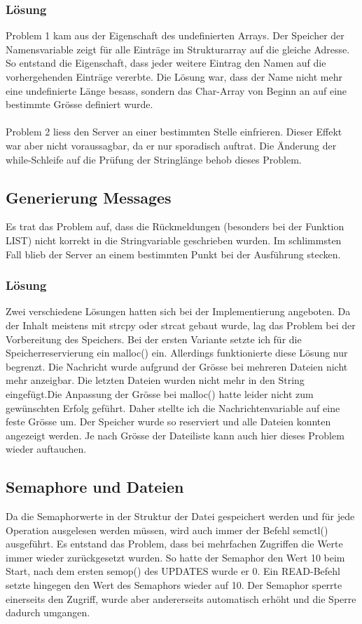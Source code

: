\documentclass[12pt,a4paper,ngerman]{report}
\begin{document}
\subsubsection{Lösung}
Problem 1 kam aus der Eigenschaft des undefinierten Arrays. Der Speicher der Namensvariable zeigt für alle Einträge im Strukturarray auf die gleiche Adresse. So entstand die Eigenschaft, dass jeder weitere Eintrag den Namen auf die vorhergehenden Einträge vererbte. Die Lösung war, dass der Name nicht mehr eine undefinierte Länge besass, sondern das Char-Array von Beginn an auf eine bestimmte Grösse definiert wurde.\\
\\
Problem 2 liess den Server an einer bestimmten Stelle einfrieren. Dieser Effekt war aber nicht voraussagbar, da er nur sporadisch auftrat. Die Änderung der while-Schleife auf die Prüfung der Stringlänge behob dieses Problem. 
\subsection{Generierung Messages}
Es trat das Problem auf, dass die Rückmeldungen (besonders bei der Funktion LIST) nicht korrekt in die Stringvariable geschrieben wurden. Im schlimmsten Fall blieb der Server an einem bestimmten Punkt bei der Ausführung stecken.
\subsubsection{Lösung}
Zwei verschiedene Lösungen hatten sich bei der Implementierung angeboten. Da der Inhalt meistens mit strcpy oder strcat gebaut wurde, lag das Problem bei der Vorbereitung des Speichers. Bei der ersten Variante setzte ich für die Speicherreservierung ein malloc() ein. Allerdings funktionierte diese Lösung nur begrenzt. Die Nachricht wurde aufgrund der Grösse bei mehreren Dateien nicht mehr anzeigbar. Die letzten Dateien wurden nicht mehr in den String eingefügt.Die Anpassung der Grösse bei malloc() hatte leider nicht zum gewünschten Erfolg geführt. Daher stellte ich die Nachrichtenvariable auf eine feste Grösse um. Der Speicher wurde so reserviert und alle Dateien konnten angezeigt werden. Je nach Grösse der Dateiliste kann auch hier dieses Problem wieder auftauchen.
\newpage
\subsection{Semaphore und Dateien}
Da die Semaphorwerte in der Struktur der Datei gespeichert werden und für jede Operation ausgelesen werden müssen, wird auch immer der Befehl semctl() ausgeführt. Es entstand das Problem, dass bei mehrfachen Zugriffen die Werte immer wieder zurückgesetzt wurden. So hatte der Semaphor den Wert 10 beim Start, nach dem ersten semop() des UPDATES wurde er 0. Ein READ-Befehl setzte hingegen den Wert des Semaphors wieder auf 10. Der Semaphor sperrte einerseits den Zugriff, wurde aber andererseits automatisch erhöht und die Sperre dadurch umgangen.
\end{document}
